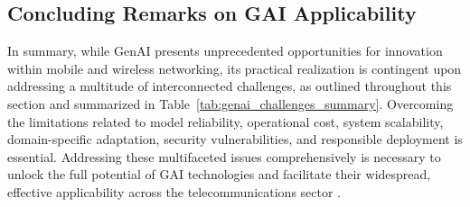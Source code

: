 \documentclass[sigconf]{acmart}
\begin{document}
\subsection{Concluding Remarks on GAI Applicability}
\label{sec:challenges_conclusion}

In summary, while GenAI presents unprecedented opportunities for innovation within mobile and wireless networking, its practical realization is contingent upon addressing a multitude of interconnected challenges, as outlined throughout this section and summarized in Table~\ref{tab:genai_challenges_summary}. Overcoming the limitations related to model reliability, operational cost, system scalability, domain-specific adaptation, security vulnerabilities, and responsible deployment is essential. Addressing these multifaceted issues comprehensively is necessary to unlock the full potential of GAI technologies and facilitate their widespread, effective applicability across the telecommunications sector \cite{ref26}.
\end{document}
